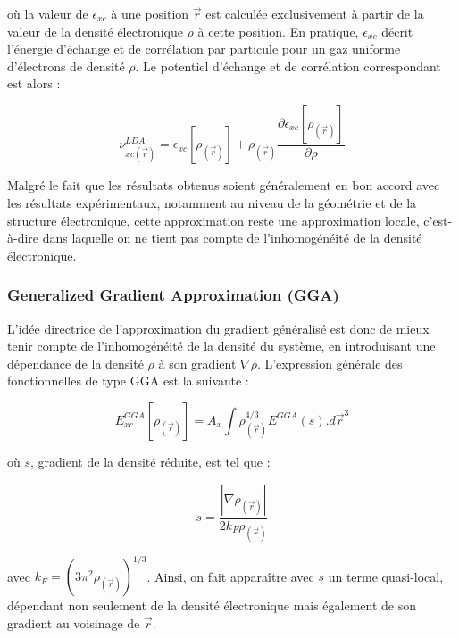 \noindent où la valeur de $\epsilon_{xc}$ à une position $\vec{r}$ est calculée exclusivement à partir de la valeur de la densité électronique $\rho$ à cette position. En pratique, $\epsilon_{xc}$ décrit l’énergie d’échange et de corrélation par particule pour un gaz uniforme d’électrons de densité $\rho$. Le potentiel d’échange et de corrélation correspondant est alors :

\begin{equation}
\nu_{xc(\vec{r})}^{LDA} = \epsilon_{xc}[\rho_{(\vec{r})}] + \rho_{(\vec{r})} \frac{\partial \epsilon_{xc}[\rho_{(\vec{r})}]}{\partial \rho}
\end{equation}

Malgré le fait que les résultats obtenus soient généralement en bon accord avec les résultats expérimentaux, notamment au niveau de la géométrie et de la structure électronique, cette approximation reste une approximation locale, c'est-à-dire dans laquelle on ne tient pas compte de l’inhomogénéité de la densité électronique.

\subsubsection{Generalized Gradient Approximation (GGA)}

L’idée directrice de l’approximation du gradient généralisé est donc de mieux tenir compte de l’inhomogénéité de la densité du système, en introduisant une dépendance de la densité $\rho$ à son gradient $\nabla \rho$. L’expression générale des fonctionnelles de type GGA est la
suivante :

\begin{equation}
E_{xc}^{GGA}[\rho_{(\vec{r})}] = A_{x} \int \rho_{(\vec{r})}^{4/3} E^{GGA}(s) .d\vec{r}^{3}
\end{equation}

\noindent où $s$, gradient de la densité réduite, est tel que :

\begin{equation}
s = \frac{|\nabla \rho_{(\vec{r})}|}{2 k_{F} \rho_{(\vec{r})}}
\end{equation}

\noindent avec $k_{F} = (3 \pi^{2} \rho_{(\vec{r})})^{1/3}$. Ainsi, on fait apparaître avec $s$ un terme quasi-local, dépendant non seulement de la densité électronique mais également de son gradient au voisinage de $\vec{r}$.

